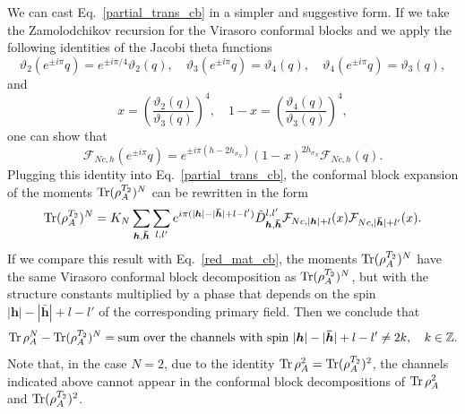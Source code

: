 \documentclass[a4paper,11pt]{article}
\def\Tr{\mathop{\mbox{\normalfont Tr}}\nolimits}
\begin{document}
We can cast Eq.~\eqref{partial_trans_cb} in a simpler and suggestive form. If we take the 
Zamolodchikov recursion for the Virasoro conformal blocks and we apply 
the following identities of the Jacobi theta functions
\begin{equation}
 \vartheta_2(e^{\pm i\pi}q)=e^{\pm i\pi/4}\vartheta_2(q), \quad 
 \vartheta_3(e^{\pm i\pi}q)=\vartheta_4(q), \quad 
 \vartheta_4(e^{\pm i\pi}q)=\vartheta_3(q),
\end{equation}
and 
\begin{equation}
 x=\left(\frac{\vartheta_2(q)}{\vartheta_3(q)}\right)^4, \quad 
 1-x=\left(\frac{\vartheta_4(q)}{\vartheta_3(q)}\right)^4,
\end{equation}
one can show that 
\begin{equation}
 \mathcal{F}_{Nc, h}(e^{\pm i\pi}q)=e^{\pm i\pi(h-2h_{\sigma_N})}
 (1-x)^{2h_{\sigma_N}}\mathcal{F}_{Nc, h}(q).
\end{equation}
Plugging this identity into Eq.~\eqref{partial_trans_cb}, the conformal block
expansion of the moments $\Tr(\rho_A^{T_2})^N$ can be rewritten
in the form
\begin{equation}\label{partial_trans_cb_2}
 \Tr(\rho_A^{T_2})^N=K_N\sum_{\boldsymbol{h}, \boldsymbol{\bar{h}}}\sum_{l, l'} 
 e^{i\pi(|\boldsymbol{h}|-|\boldsymbol{\bar{h}}|+l-l')}\tilde{D}_{\boldsymbol{h}, \boldsymbol{\bar{h}}}^{l, l'} 
 \mathcal{F}_{Nc, |\boldsymbol{h}|+l}(x)\mathcal{F}_{Nc, |\boldsymbol{\bar{h}}|+l'}(x).
\end{equation}  
If we compare this result with Eq.~\eqref{red_mat_cb}, the moments $\Tr(\rho_A^{T_2})^N$
have the same Virasoro conformal block decomposition as $\Tr(\rho_A^{T_2})^N$, 
but with the structure constants multiplied by a phase that depends on
the spin $|\boldsymbol{h}|-|\boldsymbol{\bar{h}}|+l-l'$ of the corresponding primary field. 
Then we conclude that
\begin{equation}
 \Tr\rho_A^N-\Tr(\rho_A^{T_2})^N=\text{sum over the channels with spin}\,\,
 |\boldsymbol{h}|-|\boldsymbol{\bar{h}}|+l-l'\neq 2k,\quad k\in\mathbb{Z}.
\end{equation}
Note that, in the case $N=2$, due 
to the identity $\Tr\rho_A^2=\Tr(\rho_A^{T_2})^2$, the channels indicated above cannot appear in the 
conformal block decompositions of $\Tr\rho_A^2$ and $\Tr(\rho_A^{T_2})^2$.
\end{document}
